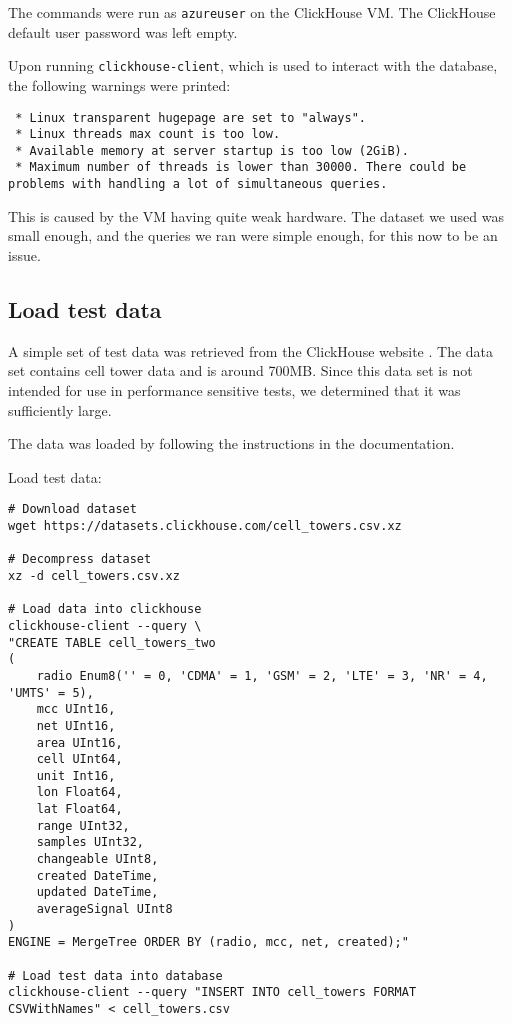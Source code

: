 The commands were run as \texttt{azureuser} on the ClickHouse VM.
The ClickHouse default user password was left empty.

Upon running \texttt{clickhouse-client}, which is used to interact with the database, the following warnings were printed:
\begin{verbatim}
 * Linux transparent hugepage are set to "always".
 * Linux threads max count is too low.
 * Available memory at server startup is too low (2GiB).
 * Maximum number of threads is lower than 30000. There could be problems with handling a lot of simultaneous queries.
\end{verbatim}

This is caused by the VM having quite weak hardware.
The dataset we used was small enough,
and the queries we ran were simple enough,
for this now to be an issue.

\subsection{Load test data}
\label{sec:org62af589}
A simple set of test data was retrieved from the ClickHouse website \cite{noauthor_cell_nodate}.
The data set contains cell tower data and is around 700MB.
Since this data set is not intended for use in performance sensitive tests,
we determined that it was sufficiently large.

The data was loaded by following the instructions in the documentation.

Load test data:
\begin{verbatim}
# Download dataset
wget https://datasets.clickhouse.com/cell_towers.csv.xz

# Decompress dataset
xz -d cell_towers.csv.xz

# Load data into clickhouse
clickhouse-client --query \
"CREATE TABLE cell_towers_two
(
    radio Enum8('' = 0, 'CDMA' = 1, 'GSM' = 2, 'LTE' = 3, 'NR' = 4, 'UMTS' = 5),
    mcc UInt16,
    net UInt16,
    area UInt16,
    cell UInt64,
    unit Int16,
    lon Float64,
    lat Float64,
    range UInt32,
    samples UInt32,
    changeable UInt8,
    created DateTime,
    updated DateTime,
    averageSignal UInt8
)
ENGINE = MergeTree ORDER BY (radio, mcc, net, created);"

# Load test data into database
clickhouse-client --query "INSERT INTO cell_towers FORMAT CSVWithNames" < cell_towers.csv
\end{verbatim}

